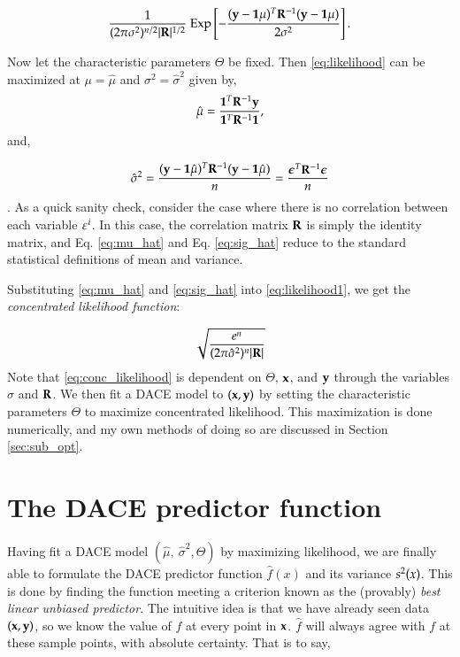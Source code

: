 \begin{equation} \label{eq:likelihood}
\frac{1}
  {(2\pi\sigma^2)^{n/2}|\mb{R}|^{1/2}}\ 
\text{Exp} \left 
  [ -\frac
    {(\mb{y}-\mb{1}\mu)^T\mb{R}^{-1}(\mb{y}-\mb{1}\mu)}
    {2\sigma^2} 
\right ].
\end{equation}

Now let the characteristic parameters $\Theta$ be fixed. Then \ref{eq:likelihood} can be maximized at $\mu = \hat{\mu}$ and $\sigma^2 = \hat{\sigma}^2$ given by,
\begin{equation} \label{eq:mu_hat}
\hat{\mu}=\frac
	{\mathbf{1}^T\mathbf{R}^{-1}\mathbf{y}}
	{\mathbf{1}^T\mathbf{R}^{-1}\mathbf{1}},
\end{equation}
and,

\begin{equation} \label{eq:sig_hat}
\hat{\sigma}^2
    = \frac{(\mathbf{y}-\mathbf{1}\hat{\mu})^T\mathbf{R}^{-1}(\mathbf{y}-\mathbf{1}\hat{\mu})}{n} 
	= \frac{\bm{\epsilon}^T\mathbf{R}^{-1}\bm{\epsilon}}{n}
\end{equation}
\citep{jones_efficient_1998}. As a quick sanity check, consider the case where there is no correlation between each variable $\varepsilon^i$. In this case, the correlation matrix $\mathbf{R}$ is simply the identity matrix, and Eq. \ref{eq:mu_hat} and Eq. \ref{eq:sig_hat} reduce to the standard statistical definitions of mean and variance.

Substituting \ref{eq:mu_hat} and \ref{eq:sig_hat} into \ref{eq:likelihood1}, we get the \emph{concentrated likelihood function}:

\begin{equation} \label{eq:conc_likelihood}
\sqrt{\frac{e^{n}}
  {(2\pi\hat{\sigma}^2)^{n}|\mathbf{R}|}}
\end{equation}
Note that \ref{eq:conc_likelihood} is dependent on $\Theta$, $\mathbf{x}$, and $\mathbf{y}$ through the variables $\hat{\sigma}$ and $\mathbf{R}$. We then fit a DACE model to $(\mathbf{x},\mathbf{y})$ by setting the characteristic parameters $\Theta$ to maximize concentrated likelihood. This maximization is done numerically, and my own methods of doing so are discussed in Section \ref{sec:sub_opt}. 

\section{The DACE predictor function}
Having fit a DACE model $(\hat{\mu},\ \hat{\sigma}^2,\Theta)$ by maximizing likelihood, we are finally able to formulate the DACE predictor function $\hat{f}(x)$ and its variance $s^2(x)$. This is done by finding the function meeting a criterion known as the (provably) \emph{best linear unbiased predictor}. The intuitive idea is that we have already seen data $(\mathbf{x},\mathbf{y})$, so we know the value of $f$ at every point in $\mathbf{x}$. $\hat{f}$ will always agree with $f$ at these sample points, with absolute certainty. That is to say,

